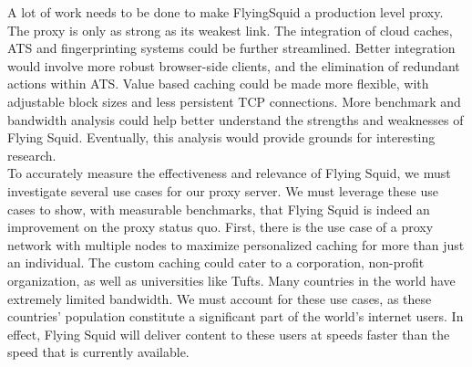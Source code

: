 \noindent
A lot of work needs to be done to make FlyingSquid a production level proxy. The proxy is only as strong as its weakest link. The integration of cloud caches, ATS and fingerprinting systems could be further streamlined. Better integration would involve more robust browser-side clients, and the elimination of redundant actions within ATS. Value based caching could be made more flexible, with adjustable block sizes and less persistent TCP connections. More benchmark and bandwidth analysis could help better understand the strengths and weaknesses of Flying Squid. Eventually, this analysis would provide grounds for interesting research.\\

\noindent
To accurately measure the effectiveness and relevance of Flying Squid, we must investigate several use cases for our proxy server. We must leverage these use cases to show, with measurable benchmarks, that Flying Squid is indeed an improvement on the proxy status quo. First, there is the use case of a proxy network with multiple nodes to maximize personalized caching for more than just an individual. The custom caching could cater to a corporation, non-profit organization, as well as universities like Tufts. 
Many countries in the world have extremely limited bandwidth. We must account for these use cases, as these countries’ population constitute a significant part of the world’s internet users. In effect, Flying Squid will deliver content to these users at speeds faster than the speed that is currently available.








